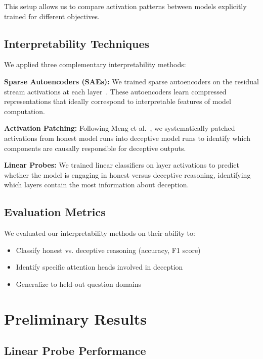 \documentclass[midterm]{sparreport}
\begin{document}
This setup allows us to compare activation patterns between models explicitly trained for different objectives.

\subsection{Interpretability Techniques}

We applied three complementary interpretability methods:

\textbf{Sparse Autoencoders (SAEs):} We trained sparse autoencoders on the residual stream activations at each layer~\cite{cunningham2023sparse}. These autoencoders learn compressed representations that ideally correspond to interpretable features of model computation.

\textbf{Activation Patching:} Following Meng et al.~\cite{meng2022locating}, we systematically patched activations from honest model runs into deceptive model runs to identify which components are causally responsible for deceptive outputs.

\textbf{Linear Probes:} We trained linear classifiers on layer activations to predict whether the model is engaging in honest versus deceptive reasoning, identifying which layers contain the most information about deception.

\subsection{Evaluation Metrics}

We evaluated our interpretability methods on their ability to:
\begin{itemize}
  \item Classify honest vs. deceptive reasoning (accuracy, F1 score)
  \item Identify specific attention heads involved in deception
  \item Generalize to held-out question domains
\end{itemize}

\section{Preliminary Results}

\subsection{Linear Probe Performance}
\end{document}
